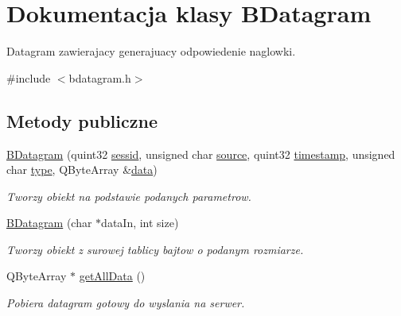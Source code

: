 \hypertarget{class_b_datagram}{
\section{Dokumentacja klasy BDatagram}
\label{class_b_datagram}
}


Datagram zawierajacy generajuacy odpowiedenie naglowki.  




{\ttfamily \#include $<$bdatagram.h$>$}

\subsection*{Metody publiczne}
\begin{DoxyCompactItemize}
\item 
\hyperlink{class_b_datagram_a6a687551e97a36b91c6a40a1c5a374ed}{BDatagram} (quint32 \hyperlink{class_b_datagram_ad77fa0aefd216480abe999e24f28dba6}{sessid}, unsigned char \hyperlink{class_b_datagram_a2e70a774059cddc0a5715850370bc1d9}{source}, quint32 \hyperlink{class_b_datagram_a1a0d1b7430e0e9d95cd9248b3499904f}{timestamp}, unsigned char \hyperlink{class_b_datagram_a3ae0b66921f9b51864beb65e5e03eeb9}{type}, QByteArray \&\hyperlink{class_b_datagram_a98d72aa468643e0179bbc02d6dbf388e}{data})
\begin{DoxyCompactList}\small\item\em Tworzy obiekt na podstawie podanych parametrow. \item\end{DoxyCompactList}\item 
\hypertarget{class_b_datagram_a63ed2c2ac245dec6a1179a3ac7ace1b6}{
\hyperlink{class_b_datagram_a63ed2c2ac245dec6a1179a3ac7ace1b6}{BDatagram} (char $\ast$dataIn, int size)}
\label{class_b_datagram_a63ed2c2ac245dec6a1179a3ac7ace1b6}

\begin{DoxyCompactList}\small\item\em Tworzy obiekt z surowej tablicy bajtow o podanym rozmiarze. \item\end{DoxyCompactList}\item 
\hypertarget{class_b_datagram_abf97808c5ae33d46feb4e2f1a920cb4f}{
QByteArray $\ast$ \hyperlink{class_b_datagram_abf97808c5ae33d46feb4e2f1a920cb4f}{getAllData} ()}
\label{class_b_datagram_abf97808c5ae33d46feb4e2f1a920cb4f}

\begin{DoxyCompactList}\small\item\em Pobiera datagram gotowy do wyslania na serwer. \item\end{DoxyCompactList}\end{DoxyCompactItemize}
